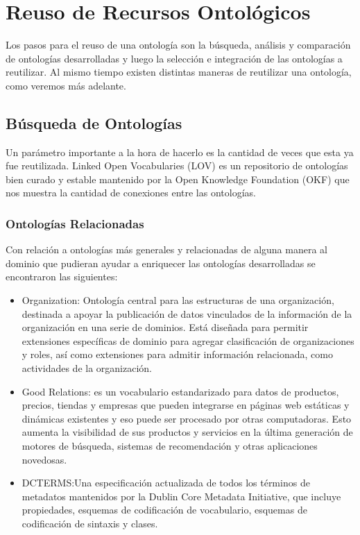 
\section{Reuso de Recursos Ontológicos}
Los pasos para el reuso de una ontología son la búsqueda, análisis y comparación de ontologías desarrolladas y luego la selección e integración de las ontologías a reutilizar. Al mismo tiempo existen distintas maneras de reutilizar una ontología, como veremos más adelante. 

\subsection{Búsqueda de Ontologías}

Un parámetro importante a la hora de hacerlo es la cantidad de veces que esta ya fue reutilizada. Linked Open Vocabularies (LOV) es un repositorio de ontologías bien curado y estable mantenido por la Open Knowledge Foundation (OKF) que nos muestra la cantidad de conexiones entre las ontologías.

\subsubsection{Ontologías Relacionadas}

Con relación a ontologías más generales y relacionadas de alguna manera al dominio que pudieran ayudar a enriquecer las ontologías desarrolladas se encontraron las siguientes:
\begin{itemize}
    \item Organization: Ontología central para las estructuras de una organización, destinada a apoyar la publicación de datos vinculados de la información de la organización en una serie de dominios. Está diseñada para permitir extensiones específicas de dominio para agregar clasificación de organizaciones y roles, así como extensiones para admitir información relacionada, como actividades de la organización.
    \item Good Relations: es un vocabulario estandarizado para datos de productos, precios, tiendas y empresas que pueden integrarse en páginas web estáticas y dinámicas existentes y eso puede ser procesado por otras computadoras. Esto aumenta la visibilidad de sus productos y servicios en la última generación de motores de búsqueda, sistemas de recomendación y otras aplicaciones novedosas.
    \item DCTERMS:Una especificación actualizada de todos los términos de metadatos mantenidos por la Dublin Core Metadata Initiative, que incluye propiedades, esquemas de codificación de vocabulario, esquemas de codificación de sintaxis y clases. 
\end{itemize}

